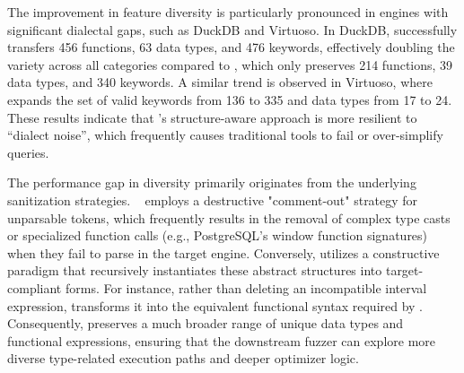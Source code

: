 \documentclass[sigconf,review,anonymous]{acmart}
\begin{document}
The improvement in feature diversity is particularly pronounced in engines with significant dialectal gaps, such as DuckDB and Virtuoso. In DuckDB, \tool{} successfully transfers 456 functions, 63 data types, and 476 keywords, effectively doubling the variety across all categories compared to \sedar{}, which only preserves 214 functions, 39 data types, and 340 keywords. A similar trend is observed in Virtuoso, where \tool{} expands the set of valid keywords from 136 to 335 and data types from 17 to 24. These results indicate that \tool{}'s structure-aware approach is more resilient to ``dialect noise'', which frequently causes traditional tools to fail or over-simplify queries. 

The performance gap in diversity primarily originates from the underlying sanitization strategies. \sedar{}~\cite{fu2024sedar} employs a destructive "comment-out" strategy for unparsable tokens, which frequently results in the removal of complex type casts or specialized function calls (e.g., PostgreSQL’s 
window function signatures) when they fail to parse in the target engine. Conversely, \tool{} utilizes a constructive paradigm that recursively instantiates these abstract structures into target-compliant forms. For instance, rather than deleting an incompatible interval expression, \tool{} transforms it into the equivalent functional syntax required by \duckdb{}. Consequently, \tool{} preserves a much broader range of unique data types and functional expressions, ensuring that the downstream fuzzer can explore more diverse type-related execution paths and deeper optimizer logic.

\end{document}
